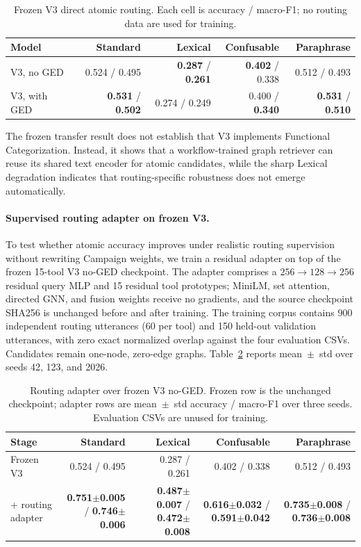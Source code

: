 \documentclass{article}
\begin{document}
\begin{table}[h]
\caption{Frozen V3 direct atomic routing. Each cell is accuracy / macro-F1; no routing data are used for training.}
\label{tab:v3_atomic_routing}
\centering
\small
\begin{tabular}{@{}lrrrr@{}}
\toprule
Model & Standard & Lexical & Confusable & Paraphrase \\
\midrule
V3, no GED & 0.524 / 0.495 & \textbf{0.287} / \textbf{0.261} & \textbf{0.402} / 0.338 & 0.512 / 0.493 \\
V3, with GED & \textbf{0.531} / \textbf{0.502} & 0.274 / 0.249 & 0.400 / \textbf{0.340} & \textbf{0.531} / \textbf{0.510} \\
\bottomrule
\end{tabular}
\end{table}

The frozen transfer result does not establish that V3 implements Functional Categorization. Instead, it shows that a workflow-trained graph retriever can reuse its shared text encoder for atomic candidates, while the sharp Lexical degradation indicates that routing-specific robustness does not emerge automatically.

\paragraph{Supervised routing adapter on frozen V3.}
To test whether atomic accuracy improves under realistic routing supervision without rewriting Campaign weights, we train a residual adapter on top of the frozen 15-tool V3 no-GED checkpoint. The adapter comprises a $256{\to}128{\to}256$ residual query MLP and 15 residual tool prototypes; MiniLM, set attention, directed GNN, and fusion weights receive no gradients, and the source checkpoint SHA256 is unchanged before and after training. The training corpus contains 900 independent routing utterances (60 per tool) and 150 held-out validation utterances, with zero exact normalized overlap against the four evaluation CSVs. Candidates remain one-node, zero-edge graphs. Table~\ref{tab:v3_routing_adapter} reports mean~$\pm$~std over seeds 42, 123, and 2026.

\begin{table}[h]
\caption{Routing adapter over frozen V3 no-GED. Frozen row is the unchanged checkpoint; adapter rows are mean~$\pm$~std accuracy / macro-F1 over three seeds. Evaluation CSVs are unused for training.}
\label{tab:v3_routing_adapter}
\centering
\small
\begin{tabular}{@{}lrrrr@{}}
\toprule
Stage & Standard & Lexical & Confusable & Paraphrase \\
\midrule
Frozen V3 & 0.524 / 0.495 & 0.287 / 0.261 & 0.402 / 0.338 & 0.512 / 0.493 \\
+ routing adapter & \textbf{0.751{\scriptsize$\pm$0.005}} / \textbf{0.746{\scriptsize$\pm$0.006}} &
  \textbf{0.487{\scriptsize$\pm$0.007}} / \textbf{0.472{\scriptsize$\pm$0.008}} &
  \textbf{0.616{\scriptsize$\pm$0.032}} / \textbf{0.591{\scriptsize$\pm$0.042}} &
  \textbf{0.735{\scriptsize$\pm$0.008}} / \textbf{0.736{\scriptsize$\pm$0.008}} \\
\bottomrule
\end{tabular}
\end{table}
\end{document}
